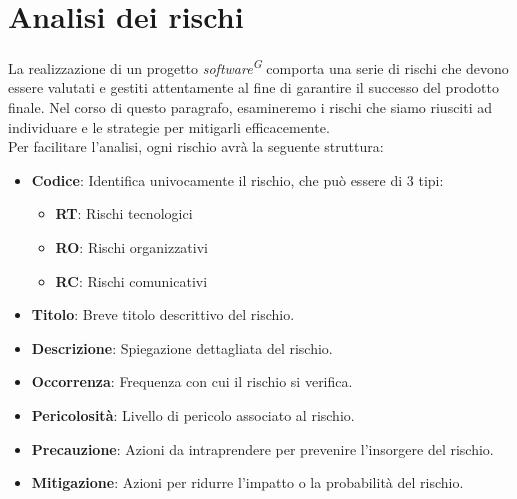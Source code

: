\documentclass[5pt]{article}
\begin{document}
\section{Analisi dei rischi}
  La realizzazione di un progetto \textit{software\textsuperscript{G}} comporta una serie di rischi che devono essere valutati e gestiti attentamente al fine di garantire il successo del prodotto finale. Nel corso di questo paragrafo, esamineremo i rischi che siamo riusciti ad individuare e le strategie per mitigarli efficacemente. \\[1\baselineskip]
  Per facilitare l'analisi, ogni rischio avrà la seguente struttura:
  \begin{itemize}
    \item \textbf{Codice}: Identifica univocamente il rischio, che può essere di 3 tipi:
        \begin{itemize}
        \item \textbf{RT}: Rischi tecnologici
        \item \textbf{RO}: Rischi organizzativi
        \item \textbf{RC}: Rischi comunicativi
        \end{itemize}
    \item \textbf{Titolo}: Breve titolo descrittivo del rischio.
    \item \textbf{Descrizione}: Spiegazione dettagliata del rischio.
    \item \textbf{Occorrenza}: Frequenza con cui il rischio si verifica.
    \item \textbf{Pericolosità}: Livello di pericolo associato al rischio.
    \item \textbf{Precauzione}: Azioni da intraprendere per prevenire l'insorgere del rischio.
    \item \textbf{Mitigazione}: Azioni per ridurre l'impatto o la probabilità del rischio.
  \end{itemize}
\end{document}
